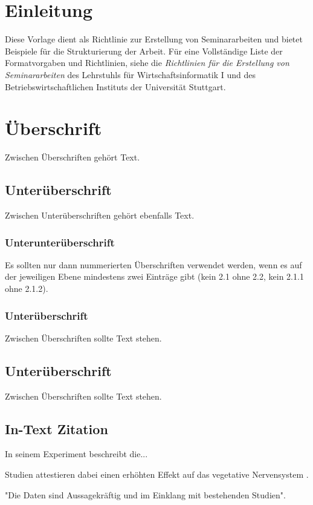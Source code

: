 \section{Einleitung} \label{chap:introduction}
Diese Vorlage dient als Richtlinie zur Erstellung von Seminararbeiten und bietet Beispiele für die Strukturierung der Arbeit. Für eine Vollständige Liste der Formatvorgaben und Richtlinien, siehe die \emph{Richtlinien für die Erstellung von Seminararbeiten} des Lehrstuhls für Wirtschaftsinformatik I und des Betriebswirtschaftlichen Instituts der Universität Stuttgart.
\section{Überschrift}
Zwischen Überschriften gehört Text.

\subsection{Unterüberschrift}
Zwischen Unterüberschriften gehört ebenfalls Text.

\subsubsection{Unterunterüberschrift}
Es sollten nur dann nummerierten Überschriften verwendet werden, wenn es auf der jeweiligen Ebene mindestens zwei Einträge gibt (kein 2.1 ohne 2.2, kein 2.1.1 ohne 2.1.2).

\subsubsection{Unterüberschrift}
Zwischen Überschriften sollte Text stehen.

\subsection{Unterüberschrift}
Zwischen Überschriften sollte Text stehen.

\subsection{In-Text Zitation}

In seinem Experiment beschreibt \textcite[1-10]{Hu60} die...

Studien attestieren dabei einen erhöhten Effekt auf das vegetative Nervensystem \parencite[3]{Hu60}.

"Die Daten sind Aussagekräftig und im Einklang mit bestehenden Studien". \textcite[5]{Hu60}


